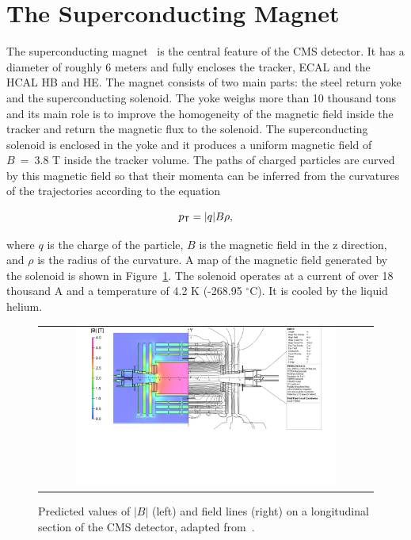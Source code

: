 \section{The Superconducting Magnet}
\label{sec:Magnet}

The superconducting magnet~\cite{CMS:1997moj} is the central feature of the \ac{CMS} detector. It has a diameter of roughly 6 meters and fully encloses the tracker, \ac{ECAL} and the \ac{HCAL} HB and HE. The magnet consists of two main parts: the steel return yoke and the superconducting solenoid. The yoke weighs more than 10 thousand tons and its main role is to improve the homogeneity of the magnetic field inside the tracker and return the magnetic flux to the solenoid. The superconducting solenoid is enclosed in the yoke and it produces a uniform magnetic field of $B~=~3.8$ T inside the tracker volume. The paths of charged particles are curved by this magnetic field so that their momenta can be inferred from the curvatures of the trajectories according to the equation

\begin{equation}
p_{\textsf{T}} = |q|B\rho,
\end{equation}

where $q$ is the charge of the particle, $B$ is the magnetic field in the z direction, and $\rho$ is the radius of the curvature. A map of the magnetic field generated by the solenoid is shown in Figure~\ref{fig:Magnet}. The solenoid operates at a current of over 18 thousand A and a temperature of 4.2 K (-268.95 $^\circ$C). It is cooled by the liquid helium.

\begin{figure}[tbh!]
 \begin{center}
 \begin{tabular}{c}
 \includegraphics[width=0.8\textwidth]{figures/Part2/CMS/Magnet}
 \end{tabular}
 \caption{Predicted values of $|B|$ (left) and field lines (right) on a longitudinal section of the \ac{CMS} detector, adapted from~\cite{CMS:2009moq}.}
 \label{fig:Magnet}
 \end{center}
\end{figure}

